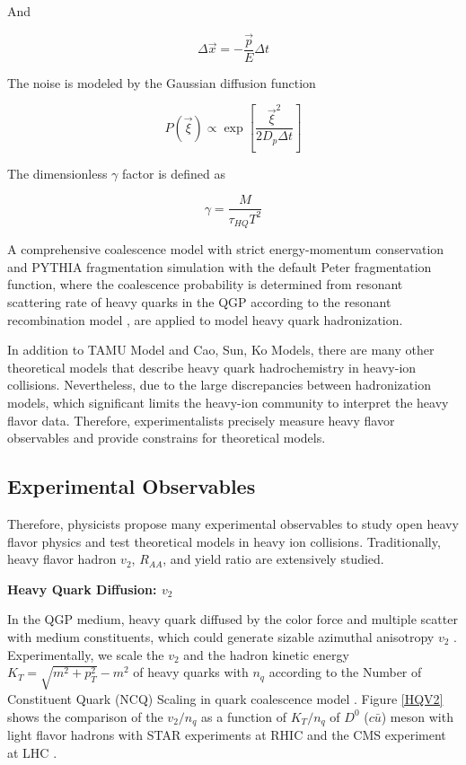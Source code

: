 And

\begin{equation}
\Delta \vec{x} = - \frac{\vec{p}}{E} \Delta t
\end{equation}

The noise is modeled by the Gaussian diffusion function 

\begin{equation}
P(\vec{\xi}) \propto \exp[\frac{\vec{\xi}^2}{2D_p \Delta t}]
\end{equation}

The dimensionless $\gamma$ factor is defined as

\begin{equation}
\gamma = \frac{M}{\tau_{HQ} T^2}
\end{equation}


A comprehensive coalescence model with strict energy-momentum conservation and PYTHIA fragmentation simulation \cite{PYTHIAFrag} with the default Peter fragmentation function, where the coalescence probability is determined from resonant scattering rate of heavy quarks in the QGP according to the resonant recombination model \cite{RRM1,RRM2}, are applied to model heavy quark hadronization.

In addition to TAMU Model and Cao, Sun, Ko Models, there are many other theoretical models that describe heavy quark hadrochemistry in heavy-ion collisions. Nevertheless, due to the large discrepancies between hadronization models, which significant limits the heavy-ion community to interpret the heavy flavor data. Therefore, experimentalists precisely measure heavy flavor observables and provide constrains for theoretical models.

\subsection{Experimental Observables}

Therefore, physicists propose many experimental observables to study open heavy flavor physics and test theoretical models in heavy ion collisions. Traditionally, heavy flavor hadron $v_2$, $R_{AA}$, and yield ratio are extensively studied. 

\textbf{Heavy Quark Diffusion: $v_2$}

In the QGP medium, heavy quark diffused by the color force and multiple scatter with medium constituents, which could generate sizable azimuthal anisotropy $v_2$ \cite{HQReview}. Experimentally, we scale the $v_2$ and the hadron kinetic energy $K_T = \sqrt{m^2 + p_T^2} - m^2$ of heavy quarks with $n_q$ according to the Number of Constituent Quark (NCQ) Scaling in quark coalescence model \cite{NCDScaling}. Figure \ref{HQV2} shows the comparison of the $v_2/n_q$ as a function of $K_T/n_q$ of $D^0$ ($c\bar u$) meson with light flavor hadrons with STAR experiments at RHIC \cite{STARD0v2} and the CMS experiment at LHC \cite{CMSD0v2}.


